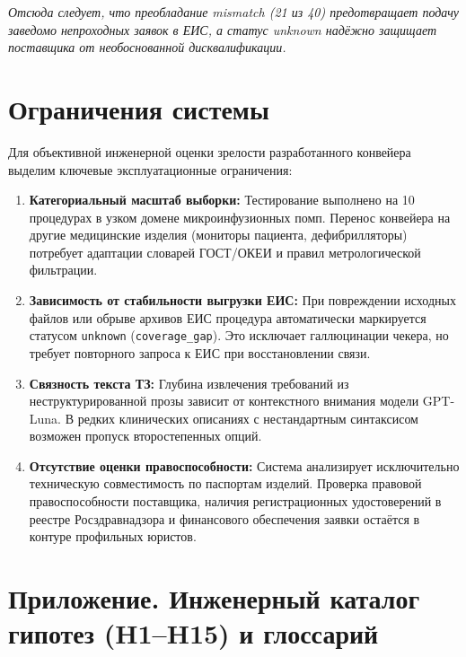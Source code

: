 \documentclass[10pt,a4paper]{article}
\begin{document}
\bigskip
\emph{Отсюда следует, что преобладание mismatch (21 из 40) предотвращает подачу заведомо непроходных заявок в ЕИС, а статус unknown надёжно защищает поставщика от необоснованной дисквалификации.}

\newpage
\section{Ограничения системы}

Для объективной инженерной оценки зрелости разработанного конвейера выделим ключевые эксплуатационные ограничения:

\begin{enumerate}[leftmargin=1.2em, itemsep=0.15em]
  \item \textbf{Категориальный масштаб выборки:} Тестирование выполнено на 10 процедурах в узком домене микроинфузионных помп. Перенос конвейера на другие медицинские изделия (мониторы пациента, дефибрилляторы) потребует адаптации словарей ГОСТ/ОКЕИ и правил метрологической фильтрации.
  \item \textbf{Зависимость от стабильности выгрузки ЕИС:} При повреждении исходных файлов или обрыве архивов ЕИС процедура автоматически маркируется статусом \texttt{unknown} (\texttt{coverage\_gap}). Это исключает галлюцинации чекера, но требует повторного запроса к ЕИС при восстановлении связи.
  \item \textbf{Связность текста ТЗ:} Глубина извлечения требований из неструктурированной прозы зависит от контекстного внимания модели GPT-Luna. В редких клинических описаниях с нестандартным синтаксисом возможен пропуск второстепенных опций.
  \item \textbf{Отсутствие оценки правоспособности:} Система анализирует исключительно техническую совместимость по паспортам изделий. Проверка правовой правоспособности поставщика, наличия регистрационных удостоверений в реестре Росздравнадзора и финансового обеспечения заявки остаётся в контуре профильных юристов.
\end{enumerate}

\vspace{0.2em}
\section*{Приложение. Инженерный каталог гипотез (H1--H15) и глоссарий}
\end{document}
